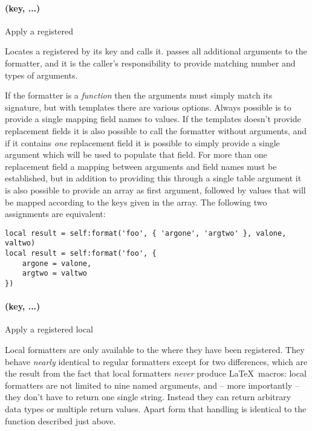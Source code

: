 \documentclass[12pt]{scrartcl}
\begin{document}
\paragraph{ (key, ...)}

Apply a registered 

\noindent Locates a registered  by its key and calls it.
 passes all additional arguments to the formatter, and it is
the caller's responsibility to provide matching number and types of arguments.

If the formatter is a \emph{function} then the arguments must simply match its
signature, but with templates there are various options.  Always possible is to
provide a single  mapping field names to values.  If the
templates doesn't provide replacement fields it is also possible to call the
formatter without arguments, and if it contains \emph{one} replacement field it
is possible to simply provide a single argument which will be used to populate
that field.  For more than one replacement field a mapping between arguments and
field names must be established, but in addition to providing this through a
single table argument it is also possible to provide an  array as
first argument, followed by values that will be mapped according to the keys
given in the array.  The following two assignments are equivalent:

\begin{verbatim}
local result = self:format('foo', { 'argone', 'argtwo' }, valone, valtwo)
local result = self:format('foo', {
	argone = valone,
	argtwo = valtwo
})
\end{verbatim}


\paragraph{ (key, ...)}

Apply a registered local 

Local formatters are only available to the  where they have been
registered.  They behave \emph{nearly} identical to regular formatters except
for two differences, which are the result from the fact that local formatters
\emph{never} produce \LaTeX\ macros:  local formatters are not limited to nine
named arguments, and -- more importantly -- they don't have to return one single
string. Instead they can return arbitrary data types or multiple return values.
Apart form that handling is identical to the  function
described just above.
\end{document}
